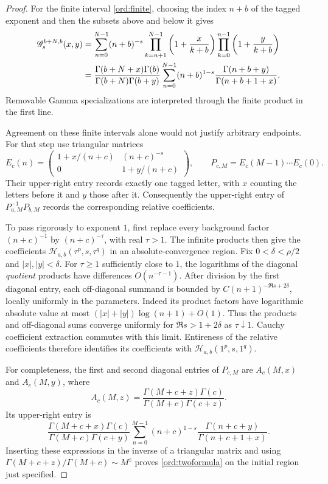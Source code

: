 \documentclass[11pt,a4paper]{article}
\numberwithin{equation}{section}
\theoremstyle{definition}
\theoremstyle{remark}
\newcommand{\Hrel}{\mathcal H}
\begin{document}
\begin{proof}
For the finite interval \eqref{ord:finite}, choosing the index $n+b$ of
the tagged exponent and then the subsets above and below it gives
\begin{align}
 \mathscr G_s^{b+N,b}(x,y)
 &=\sum_{n=0}^{N-1}(n+b)^{-s}
       \prod_{k=n+1}^{N-1}\left(1+\frac{x}{k+b}\right)
       \prod_{k=0}^{n-1}\left(1+\frac{y}{k+b}\right) \notag\\
 &=\frac{\Gamma(b+N+x)\Gamma(b)}
          {\Gamma(b+N)\Gamma(b+y)}
    \sum_{n=0}^{N-1}(n+b)^{1-s}
          \frac{\Gamma(n+b+y)}{\Gamma(n+b+1+x)}.
 \label{ord:finitegamma}
\end{align}
Removable Gamma specializations are interpreted through the finite
product in the first line.

Agreement on these finite intervals alone would not justify arbitrary
endpoints.  For that step use triangular matrices
\[
 E_c(n)=
 \begin{pmatrix}
  1+x/(n+c)&(n+c)^{-s}\\
  0&1+y/(n+c)
 \end{pmatrix},
 \qquad P_{c,M}=E_c(M-1)\cdots E_c(0).
\]
Their upper-right entry records exactly one tagged letter, with $x$
counting the letters before it and $y$ those after it.  Consequently
the upper-right entry of $P_{a,M}^{-1}P_{b,M}$ records the corresponding
relative coefficients.

To pass rigorously to exponent $1$, first replace every background
factor $(n+c)^{-1}$ by $(n+c)^{-\tau}$, with real $\tau>1$.
The infinite products then give the coefficients
$\Hrel_{a,b}(\tau^p,s,\tau^q)$ in an absolute-convergence region.
Fix $0<\delta<\rho/2$ and $|x|,|y|<\delta$.  For $\tau\ge1$
sufficiently close to $1$, the logarithms of the diagonal
\emph{quotient} products have differences $O(n^{-\tau-1})$.
After division by the first diagonal entry, each off-diagonal summand
is bounded by
$C(n+1)^{-\Re s+2\delta}$, locally uniformly in the parameters.
Indeed its product factors have logarithmic absolute value at most
$(|x|+|y|)\log(n+1)+O(1)$.
Thus the products and off-diagonal sums converge uniformly for
$\Re s>1+2\delta$ as $\tau\downarrow1$.  Cauchy coefficient extraction
commutes with this limit.  Entireness of the relative coefficients
therefore identifies its coefficients with
$\Hrel_{a,b}(1^p,s,1^q)$.

For completeness, the first and second diagonal entries of $P_{c,M}$
are $A_c(M,x)$ and $A_c(M,y)$, where
\[
 A_c(M,z)=
   \frac{\Gamma(M+c+z)\Gamma(c)}
        {\Gamma(M+c)\Gamma(c+z)}.
\]
Its upper-right entry is
\[
 \frac{\Gamma(M+c+x)\Gamma(c)}
      {\Gamma(M+c)\Gamma(c+y)}
 \sum_{n=0}^{M-1}(n+c)^{1-s}
       \frac{\Gamma(n+c+y)}{\Gamma(n+c+1+x)}.
\]
Inserting these expressions in the inverse of a triangular matrix and
using $\Gamma(M+c+z)/\Gamma(M+c)\sim M^z$ proves
\eqref{ord:twoformula} on the initial region just specified.


\end{proof}
\end{document}
